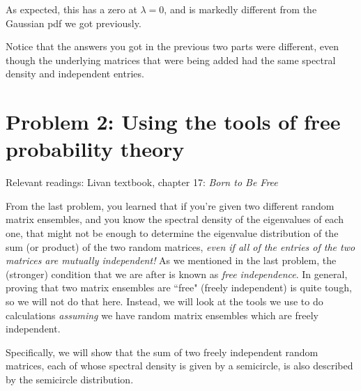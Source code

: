 \documentclass[a4paper]{article}
\begin{document}
\begin{enumerate}[label=(\alph*)]
\begin{tcolorbox}
As expected, this has a zero at $\lambda=0$, and is markedly different from the Gaussian pdf we got previously.  
\end{tcolorbox}


Notice that the answers you got in the previous two parts were different, even though the underlying matrices that were being added had the same spectral density and independent entries.  

\end{enumerate}

\section*{Problem 2: Using the tools of free probability theory}

Relevant readings: Livan textbook, chapter 17: \emph{Born to Be Free}

From the last problem, you learned that if you're given two different random matrix ensembles, and you know the spectral density of the eigenvalues of each one, that might not be enough to determine the eigenvalue distribution of the sum (or product) of the two random matrices, \emph{even if all of the entries of the two matrices are mutually independent!}   As we mentioned in the last problem, the (stronger) condition that we are after is known as \emph{free independence}.  In general, proving that two matrix ensembles are ``free" (freely independent) is quite tough, so we will not do that here.  Instead, we will look at the tools we use to do calculations \emph{assuming} we have random matrix ensembles which are freely independent.

Specifically, we will show that the sum of two freely independent random matrices, each of whose spectral density is given by a semicircle, is also described by the semicircle distribution.
\end{document}
